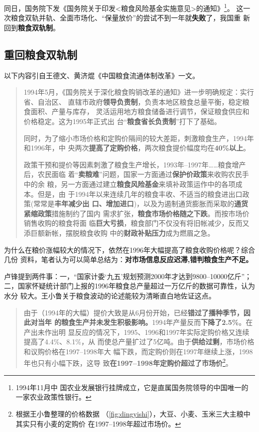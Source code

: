 同日，国务院下发《国务院关于印发<粮食风险基金实施意见>的通知》\footnote{1994年11月中
  国农业发展银行挂牌成立，它是直属国务院领导的中国唯一的一家农业政策性银行。}。
这一次粮食双轨并轨、全面市场化、“保量放价”的尝试不到一年就\textbf{失败}了，我国重
新回到\textbf{粮食双轨制}。


\subsection{重回粮食双轨制}

以下内容引自王德文、黄济焜《中国粮食流通体制改革》一文。
\begin{quotation}
  1994年5月，《国务院关于深化粮食购销改革的通知》进一步明确规定：实行省、自治区、
  直辖市政府\textbf{领导负责制}，负责本地区粮食总量平衡，稳定粮食面积、产量与库存，
  灵活运用地方粮食储备进行调节，保证粮食供应和价格稳定。这为1995年正式出
  台“\textbf{粮食省长负责制}”打下了基础。

  同时，为了缩小市场价格和定购价隔间的较大差距，刺激粮食生产，1994年和1996年，中
  央两次\textbf{提高了定购价格}，两次粮食提价幅度均在\textbf{40\%以上}。

  政策干预和提价等因素刺激了粮食生产增长，1993年--1997年……粮食增产后，农民面临
  着“\textbf{卖粮难}”问题，国家一方面通过\textbf{保护价政策}来收购农民手中的余
  粮，另一方面通过建立\textbf{粮食风险基金}来填补政策运作中的各项成本。但是，由
  于1994年以来连续几年的粮食丰收、不适当的粮食进出口政策(常常是\textbf{丰年减少出
    口、增加进口})，以及为遏制通货膨胀而采取的\textbf{通货紧缩政策}措施制约了国内
  需求扩张，\textbf{粮食市场价格随之下跌}。而按市场价销售收购的粮食将面
  临\textbf{巨大亏损}，粮食部门不仅没有将旧帐减少，反而又添巨额新帐，摆脱粮食收购
  中的\textbf{财政补贴压力}成为燃眉之急。
\end{quotation}

为什么在粮价涨幅较大的情况下，依然在1996年大幅提高了粮食收购价格呢？综合几份
资料，笔者认为可以简单总结为：\textbf{对市场信息反应迟滞,错判粮食生产不足。}

卢锋提到两件事：一，“国家计委‘九五’规划预测2000年才达到9800--10000亿斤”；
二，国家怀疑统计部门上报的1996年粮食总产量超过一万亿斤的数据可靠性，认为水分
较大。王小鲁关于粮食波动的论述能较为清晰直白地佐证这点。
\begin{quotation}
  由于（1994年的大幅）提价大致是从6月份开始，已经\textbf{错过了播种季节，因此对当年
    的粮食生产并未发生积极影响。}1994年产量反而\textbf{下降了2.5\%}。在产出未作出明
  显反应的情况下，1995、1996和1997年实际定购价格又连续提高了4.4\%、8.1\%，从
  而使总产量扩过了5亿吨。由于\textbf{供给过剩}，市场价格和议购价格在1997--1998年大
  幅下跌，而定购价则在1997年继续上涨，1998年也只有小幅下跌，这导
  致\textbf{在1997--1998年定购价超过了市场价}\footnote{根据王小鲁整理的价格数据
    （\cref{fig:dingyishi}），大豆、小麦、玉米三大主粮中其实只有小麦的定购价
    在1997--1998年超过市场价。}。\cite{wangxiaoluliangshi}
\end{quotation}

